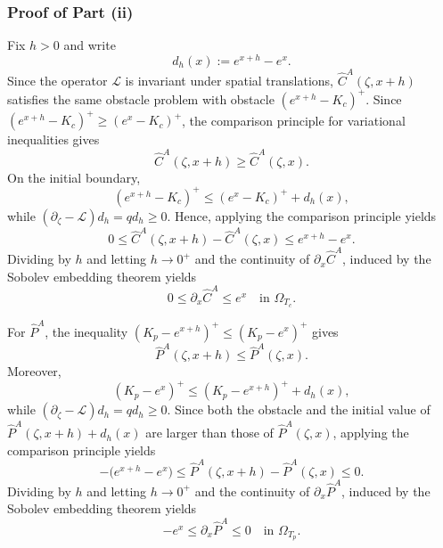 \documentclass[11pt, a4paper, leqno]{amsart}
\numberwithin{equation}{section}
\theoremstyle{plain}
\theoremstyle{definition}
\theoremstyle{remark}
\def\leq{\leqslant}
\def\geq{\geqslant}
\begin{document}
{
\subsubsection*{Proof of Part (ii)}

Fix $h>0$ and write
\[
    d_h(x):=e^{x+h}-e^x.
\]
Since the operator $\mathcal L$ is invariant under spatial
translations, $\widehat{C}^A(\zeta,x+h)$ satisfies the same obstacle
problem with obstacle $(e^{x+h}-K_c)^+$. Since
$(e^{x+h}-K_c)^+\geq(e^x-K_c)^+$, the comparison principle for
variational inequalities \cite[Theorem 1.2]{YY08} gives
\[
    \widehat{C}^A(\zeta,x+h)\geq\widehat{C}^A(\zeta,x).
\]
On the initial boundary,
\[
    (e^{x+h}-K_c)^+
    \leq (e^x-K_c)^++d_h(x),
\]
while
$(\partial_\zeta-\mathcal L)d_h=qd_h\geq0$.
Hence, applying the
comparison principle \cite[Theorem 1.2]{YY08} yields
\[
    0\leq
    \widehat{C}^A(\zeta,x+h)-\widehat{C}^A(\zeta,x)
    \leq e^{x+h}-e^x.
\]
Dividing by $h$ and letting $h\to0^+$ and the continuity of $\partial_x\widehat{C}^A$, induced by the Sobolev embedding theorem yields
\[
    0\leq\partial_x\widehat{C}^A\leq e^x
    \quad\text{in }\Omega_{T_c}.
\]

For $\widehat{P}^A$, the inequality
$(K_p-e^{x+h})^+\leq(K_p-e^x)^+$ gives
\[
    \widehat{P}^A(\zeta,x+h)
    \leq\widehat{P}^A(\zeta,x).
\]
Moreover,
\[
    (K_p-e^x)^+
    \leq (K_p-e^{x+h})^++d_h(x),
\]
while
$(\partial_\zeta-\mathcal L)d_h=qd_h\geq0$.
Since both the obstacle and the initial value of
$\widehat{P}^A(\zeta,x+h)+d_h(x)$ are larger than those of
$\widehat{P}^A(\zeta,x)$, applying the comparison principle
\cite[Theorem 1.2]{YY08} yields
\[
    -\bigl(e^{x+h}-e^x\bigr)
    \leq
    \widehat{P}^A(\zeta,x+h)-\widehat{P}^A(\zeta,x)
    \leq0.
\]
Dividing by $h$ and letting $h\to0^+$ and the continuity of $\partial_x \widehat{P}^A$, induced by the Sobolev embedding theorem yields
\[
    -e^x\leq\partial_x\widehat{P}^A\leq0
    \quad\text{in }\Omega_{T_p}.
\]}
\end{document}

